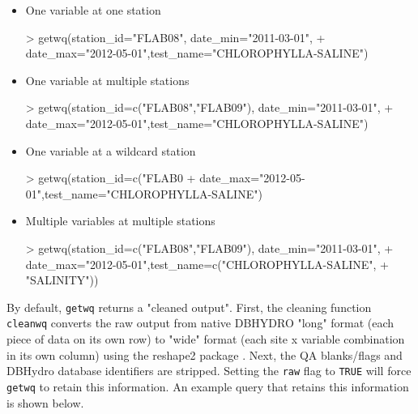 \documentclass[12pt,notitlepage]{article}
\begin{document}
\begin{itemize}
\item One variable at one station

\begin{Schunk}
\begin{Sinput}
> getwq(station_id="FLAB08", date_min="2011-03-01",
+             date_max="2012-05-01",test_name="CHLOROPHYLLA-SALINE")
\end{Sinput}
\end{Schunk}

\item One variable at multiple stations

\begin{Schunk}
\begin{Sinput}
> getwq(station_id=c("FLAB08","FLAB09"), date_min="2011-03-01",
+             date_max="2012-05-01",test_name="CHLOROPHYLLA-SALINE")
\end{Sinput}
\end{Schunk}

\item One variable at a wildcard station

\begin{Schunk}
\begin{Sinput}
> getwq(station_id=c("FLAB0%
+             date_max="2012-05-01",test_name="CHLOROPHYLLA-SALINE")
\end{Sinput}
\end{Schunk}

\item Multiple variables at multiple stations

\begin{Schunk}
\begin{Sinput}
> getwq(station_id=c("FLAB08","FLAB09"), date_min="2011-03-01",
+             date_max="2012-05-01",test_name=c("CHLOROPHYLLA-SALINE",
+                                               "SALINITY"))
\end{Sinput}
\end{Schunk}

\end{itemize}

\noindent By default, \verb|getwq| returns a "cleaned output". First, the cleaning function \verb|cleanwq| converts the raw output from native DBHYDRO "long" format (each piece of data on its own row) to "wide" format (each site x variable combination in its own column) using the reshape2 package \citep{reshape2}. Next, the QA blanks/flags and DBHydro database identifiers are stripped. Setting the \texttt{raw} flag to \texttt{TRUE} will force \verb|getwq| to retain this information. An example query that retains this information is shown below.
\end{document}
